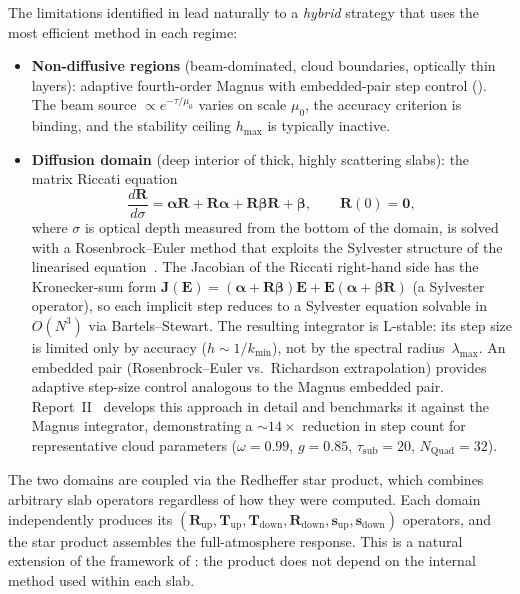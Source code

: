 \documentclass[11pt,a4paper]{article}
\newcommand{\vect}[1]{\bm{#1}}
\newcommand{\mat}[1]{\mathbf{#1}}
\theoremstyle{definition}
\begin{document}
The limitations identified in  lead
naturally to a \emph{hybrid} strategy that uses the most efficient
method in each regime:
\begin{itemize}[nosep]
\item \textbf{Non-diffusive regions} (beam-dominated, cloud boundaries,
  optically thin layers): adaptive fourth-order Magnus with
  embedded-pair step control ().  The beam
  source $\propto e^{-\tau/\mu_0}$ varies on scale $\mu_0$, the
  accuracy criterion is binding, and the stability ceiling $h_{\max}$
  is typically inactive.
\item \textbf{Diffusion domain} (deep interior of thick, highly
  scattering slabs): the matrix Riccati equation
  \begin{equation}\label{eq:riccati_preview}
    \frac{d\mat{R}}{d\sigma}
    = \mat{\alpha}\mat{R} + \mat{R}\mat{\alpha}
      + \mat{R}\mat{\beta}\mat{R} + \mat{\beta},
    \qquad \mat{R}(0) = \mat{0},
  \end{equation}
  where $\sigma$ is optical depth measured from the bottom of the
  domain, is solved with a Rosenbrock--Euler method that exploits the
  Sylvester structure of the linearised
  equation~\cite{hairer1996,bartels1972}.  The Jacobian of
  the Riccati right-hand side has the Kronecker-sum form
  $\mat{J}(\mat{E})
  = (\mat{\alpha}+\mat{R}\mat{\beta})\mat{E}
  + \mat{E}(\mat{\alpha}+\mat{\beta}\mat{R})$
  (a Sylvester operator), so each implicit step reduces to a
  Sylvester equation solvable in $O(N^3)$ via Bartels--Stewart.
  The resulting integrator is L-stable: its step size is limited only
  by accuracy ($h\sim 1/k_{\min}$), not by the spectral
  radius~$\lambda_{\max}$.
  An embedded pair (Rosenbrock--Euler vs.\ Richardson extrapolation)
  provides adaptive step-size control analogous to the Magnus embedded
  pair.  Report~II~\cite{report2} develops this approach in detail and
  benchmarks it against the Magnus integrator, demonstrating a
  $\sim\!14\!\times$ reduction in step count for representative cloud
  parameters ($\omega=0.99$, $g=0.85$, $\tau_{\text{sub}}=20$,
  $N_{\text{Quad}}=32$).
\end{itemize}

The two domains are coupled via the Redheffer star product, which
combines arbitrary slab operators regardless of how they were computed.
Each domain independently produces its
$(\mat{R}_{\text{up}},\mat{T}_{\text{up}},\mat{T}_{\text{down}},
\mat{R}_{\text{down}},\vect{s}_{\text{up}},\vect{s}_{\text{down}})$
operators, and the star product assembles the full-atmosphere response.
This is a natural extension of the framework of
: the product does not depend on the internal
method used within each slab.
\end{document}
